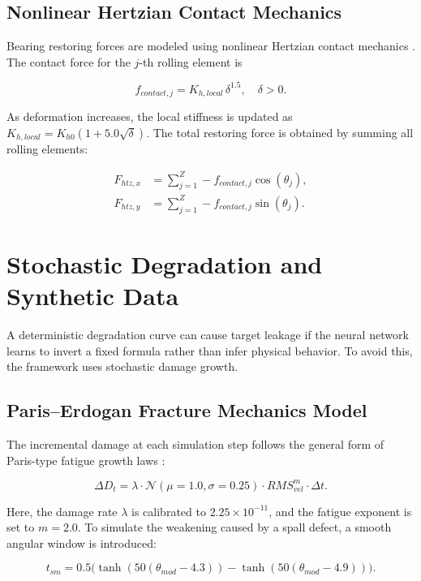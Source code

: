\documentclass[journal,10pt,a4paper]{IEEEtran}
\begin{document}
\subsection{Nonlinear Hertzian Contact Mechanics}
Bearing restoring forces are modeled using nonlinear Hertzian contact mechanics \cite{hertz1882,hertz_mdpi}. The contact force for the $j$-th rolling element is

\begin{equation}
 f_{contact,j} = K_{h,local}\,\delta^{1.5}, \quad \delta > 0.
\end{equation}

As deformation increases, the local stiffness is updated as $K_{h,local} = K_{h0}(1 + 5.0\sqrt{\delta})$. The total restoring force is obtained by summing all rolling elements:

\begin{align}
 F_{htz,x} &= \sum_{j=1}^{Z} -f_{contact,j}\cos(\theta_j), \\
 F_{htz,y} &= \sum_{j=1}^{Z} -f_{contact,j}\sin(\theta_j).
\end{align}

\section{Stochastic Degradation and Synthetic Data}
A deterministic degradation curve can cause target leakage if the neural network learns to invert a fixed formula rather than infer physical behavior. To avoid this, the framework uses stochastic damage growth.

\subsection{Paris--Erdogan Fracture Mechanics Model}
The incremental damage at each simulation step follows the general form of Paris-type fatigue growth laws \cite{paris_law,stochastic_paris,bearing_fatigue}:

\begin{equation}
\Delta D_t = \lambda \cdot \mathcal{N}(\mu=1.0,\sigma=0.25) \cdot RMS_{vel}^m \cdot \Delta t.
\end{equation}

Here, the damage rate $\lambda$ is calibrated to $2.25 \times 10^{-11}$, and the fatigue exponent is set to $m=2.0$. To simulate the weakening caused by a spall defect, a smooth angular window is introduced:

\begin{equation}
 t_{sm} = 0.5 \big( \tanh(50(\theta_{mod} - 4.3)) - \tanh(50(\theta_{mod} - 4.9)) \big).
\end{equation}
\end{document}
